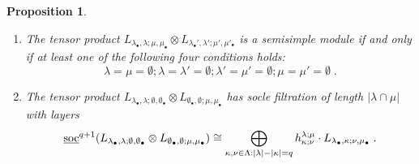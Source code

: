 \documentclass[12pt]{article}
\def\ul  {\underline}
\newtheorem{prop}[theorem]{Proposition}
\begin{document}
\begin{prop}
\begin{enumerate}
$$
{\rm soc}(L_{\lambda_\bullet,\lambda;\mu,\mu_\bullet}\otimes L_{\lambda_\bullet',\lambda';\mu',\mu'_\bullet}) \cong \bigoplus\limits_{(\kappa_\bullet,\kappa;\nu,\nu_\bullet)\in\bm\Lambda} {\bf N}^{\kappa_\bullet}_{\lambda_\bullet\lambda'_\bullet} N^{\kappa}_{\lambda\lambda'} N^{\nu}_{\mu\mu'} {\bf N}^{\nu_\bullet}_{\mu_\bullet\mu'_\bullet} \cdot L_{\kappa_\bullet,\kappa;\nu,\nu_\bullet} \;.
$$
\item[{\rm (d)}] The tensor product $L_{\lambda_\bullet,\lambda;\mu,\mu_\bullet}\otimes L_{\lambda_\bullet',\lambda';\mu',\mu'_\bullet}$ is a semisimple module if and only if at least one of the following four conditions holds:
$$
\lambda=\mu=\emptyset ; \lambda=\lambda'=\emptyset ; \lambda'=\mu'=\emptyset ; \mu=\mu'=\emptyset \;.
$$
\item[{\rm (e)}] The tensor product $L_{\lambda_\bullet,\lambda;\emptyset,\emptyset_\bullet}\otimes L_{\emptyset_\bullet,\emptyset;\mu,\mu_\bullet}$ has socle filtration of length $|\lambda\cap\mu|$ with layers
$$
\ul{\rm soc}^{q+1}(L_{\lambda_\bullet,\lambda;\emptyset,\emptyset_\bullet}\otimes L_{\emptyset_\bullet,\emptyset;\mu,\mu_\bullet})\cong \bigoplus_{\kappa,\nu\in\Lambda:|\lambda|-|\kappa|=q} h^{\lambda;\mu}_{\kappa;\nu} \cdot L_{\lambda_\bullet,\kappa;\nu,\mu_\bullet} \;.
$$
\end{enumerate}
\end{prop}
\end{document}
